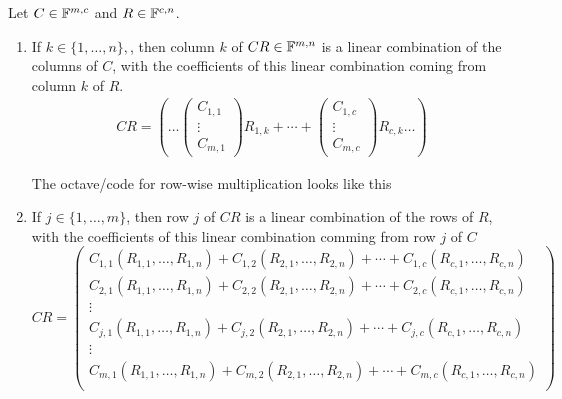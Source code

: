 \begin{thm}
  Let $C\in\mathbb{F}^{m,c}$ and $R\in\mathbb{F}^{c,n}$.
  \begin{enumerate}
    \item If $k \in \{1,\ldots,n\},$, then column $k$ of $CR\in \mathbb{F}^{m,n}$ is a linear combination of the columns of $C$, with the coefficients of this linear combination coming from column $k$ of $R$.
    \begin{equation}
      \begin{aligned}
        CR = 
          \left ( \ldots \left(
            \begin{matrix}C_{1,1} 
              \\ \vdots \\ C_{m,1} 
            \end{matrix}
          \right) R_{1,k} 
          + \cdots + 
          \left(
            \begin{matrix}C_{1,c}
              \\ \vdots \\ C_{m,c} 
            \end{matrix}\right) R_{c,k}
          \ldots
        \right)
      \end{aligned}
    \end{equation}
    
  The octave\-/code for row-wise multiplication looks like this
  \begin{center}    
    \begin{minipage}{\linewidth}
      \addtolength{\linewidth}{-7em}  
      
      \addtolength{\linewidth}{+7em}
    \end{minipage}
  \end{center}
  
    \item If $j\in \{1, \ldots, m\}$, then row $j$ of $CR$ is a linear combination of the rows of $R$, with the coefficients of this linear combination comming from row $j$ of $C$
    \begin{equation}
      CR = 
      \left(
        \begin{matrix}
          C_{1,1} (R_{1,1}, \ldots, R_{1,n}) + C_{1,2} (R_{2,1}, \ldots, R_{2,n}) + \cdots + C_{1,c} (R_{c,1}, \ldots, R_{c,n}) \\
          C_{2,1} (R_{1,1}, \ldots, R_{1,n}) + C_{2,2} (R_{2,1}, \ldots, R_{2,n}) + \cdots + C_{2,c} (R_{c,1}, \ldots, R_{c,n}) \\
          \vdots \\
          C_{j,1} (R_{1,1}, \ldots, R_{1,n}) + C_{j,2} (R_{2,1}, \ldots, R_{2,n}) + \cdots + C_{j,c} (R_{c,1}, \ldots, R_{c,n}) \\
          \vdots \\
          C_{m,1} (R_{1,1}, \ldots, R_{1,n}) + C_{m,2} (R_{2,1}, \ldots, R_{2,n}) + \cdots + C_{m,c} (R_{c,1}, \ldots, R_{c,n}) \\
        \end{matrix}
      \right)
    \end{equation}
    


\end{enumerate}
\end{thm}
